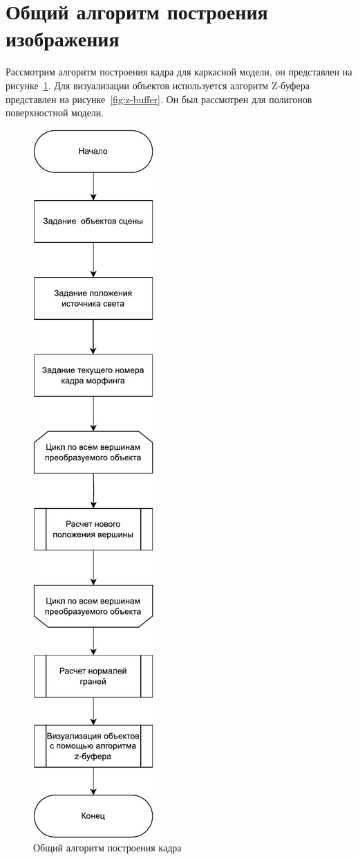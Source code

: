 \section{Общий алгоритм построения изображения}
Рассмотрим алгоритм построения кадра для каркасной модели, он представлен на рисунке~\ref{fig:frame_algo}. 
Для визуализации объектов используется алгоритм Z-буфера представлен на рисунке~\ref{fig:z-buffer}.
Он был рассмотрен для полигонов поверхностной модели.


\begin{figure}[H]
	\centering
	\includegraphics[height=1.45\textwidth]{images/frame_algo_morph.pdf}
	\caption{Общий алгоритм построения кадра}
	\label{fig:frame_algo}
\end{figure}


